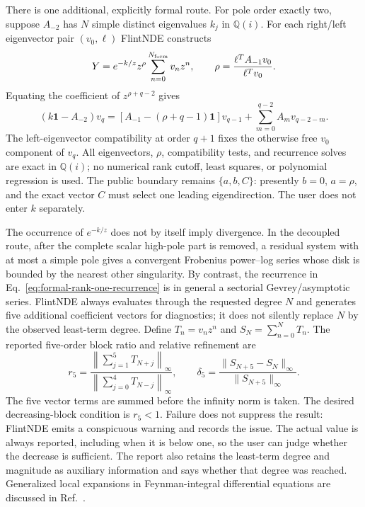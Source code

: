 \documentclass[11pt]{article}
\newcommand{\Id}{\mathbf 1}
\begin{document}
There is one additional, explicitly formal route.  For pole order exactly two, suppose
$A_{-2}$ has $N$ simple distinct eigenvalues $k_j$ in $\mathbb Q(i)$.  For each right/left
eigenvector pair $(v_0,\ell)$ FlintNDE constructs
\begin{equation}
 Y=e^{-k/z}z^\rho\sum_{n=0}^{N_{\rm form}}v_nz^n,
 \qquad
 \rho=\frac{\ell^T A_{-1}v_0}{\ell^Tv_0}.
 \label{eq:formal-rank-one-ansatz}
\end{equation}
Equating the coefficient of $z^{\rho+q-2}$ gives
\begin{equation}
 (k\Id-A_{-2})v_q=
 \left[A_{-1}-(\rho+q-1)\Id\right]v_{q-1}
 +\sum_{m=0}^{q-2}A_m v_{q-2-m}.
 \label{eq:formal-rank-one-recurrence}
\end{equation}
The left-eigenvector compatibility at order $q+1$ fixes the otherwise free $v_0$ component
of $v_q$.  All eigenvectors, $\rho$, compatibility tests, and recurrence solves are exact in
$\mathbb Q(i)$; no numerical rank cutoff, least squares, or polynomial regression is used.
The public boundary remains $\{a,b,C\}$: presently $b=0$, $a=\rho$, and the exact vector $C$
must select one leading eigendirection.  The user does not enter $k$ separately.

The occurrence of $e^{-k/z}$ does not by itself imply divergence.  In the decoupled route,
after the complete scalar high-pole part is removed, a residual system with at most a simple
pole gives a convergent Frobenius power--log series whose disk is bounded by the nearest other
singularity.  By contrast, the recurrence in Eq.~\eqref{eq:formal-rank-one-recurrence} is in
general a sectorial Gevrey/asymptotic series.  FlintNDE always evaluates through the requested
degree $N$ and generates five additional coefficient vectors for diagnostics; it does not
silently replace $N$ by the observed least-term degree.  Define $T_n=v_nz^n$ and
$S_N=\sum_{n=0}^{N}T_n$.  The reported five-order block ratio and relative refinement are
\begin{equation}
 r_5=\frac{\left\|\sum_{j=1}^{5}T_{N+j}\right\|_\infty}
 {\left\|\sum_{j=0}^{4}T_{N-j}\right\|_\infty},
 \qquad
 \delta_5=\frac{\|S_{N+5}-S_N\|_\infty}{\|S_{N+5}\|_\infty}.
 \label{eq:formal-five-order-test}
\end{equation}
The five vector terms are summed before the infinity norm is taken.  The desired decreasing-block
condition is $r_5<1$.  Failure does not suppress the result: FlintNDE emits a conspicuous warning
and records the issue.  The actual value is always reported, including when it is below one, so
the user can judge whether the decrease is sufficient.  The report also retains the least-term
degree and magnitude as auxiliary information and says whether that degree was reached.
Generalized local expansions in Feynman-integral differential equations are discussed in
Ref.~\cite{Moriello:2019yhu}.
\end{document}
